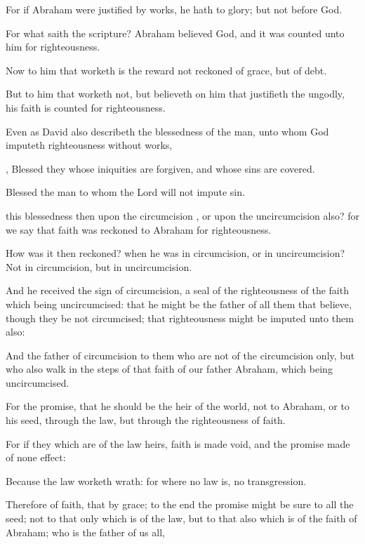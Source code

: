 {For
if
Abraham were
justified
by
works, he
hath
{} to
glory;
but
not
before
God.

For
what
saith the
scripture?
Abraham
believed
God,
and it was
counted unto
him
for
righteousness.

Now to him that
worketh
is the
reward
not
reckoned
of
grace,
but
of
debt.

But to him that
worketh
not,
but
believeth
on him that
justifieth the
ungodly,
his
faith is
counted
for
righteousness.

Even
as
David
also
describeth the
blessedness of the
man, unto
whom
God
imputeth
righteousness
without
works,

,
Blessed
{} they
whose
iniquities are
forgiven,
and
whose
sins are
covered.

Blessed
{} the
man to
whom the
Lord
will
not
impute
sin.

this
blessedness
then
upon the
circumcision
{},
or
upon the
uncircumcision
also?
for we
say
that
faith was
reckoned to
Abraham
for
righteousness.

How was
it
then
reckoned? when he
was
in
circumcision,
or
in
uncircumcision?
Not
in
circumcision,
but
in
uncircumcision.

And he
received the
sign of
circumcision, a
seal of the
righteousness of the
faith
which
{}
being
uncircumcised:
that
he might
be the
father of
all them that
believe, though they
be not
circumcised;
that
righteousness might be
imputed unto
them
also:

And the
father of
circumcision to them who
are
not
of the
circumcision
only,
but
who
also
walk in the
steps of that
faith
of
our
father
Abraham,
which
{}
being
{}
uncircumcised.

For the
promise, that
he should
be the
heir of the
world,
{}
not to
Abraham,
or
to
his
seed,
through the
law,
but
through the
righteousness of
faith.

For
if they which
are
of the
law
{}
heirs,
faith is made
void,
and the
promise made of none
effect:

Because the
law
worketh
wrath:
for
where
no
law
is,
{}
no
transgression.

Therefore
{}
of
faith,
that
{}
by
grace; to the
end the
promise might
be
sure to
all the
seed;
not to
that
only which is
of the
law,
but to
that
also which is
of the
faith of
Abraham;
who
is the
father of
us
all,

}
